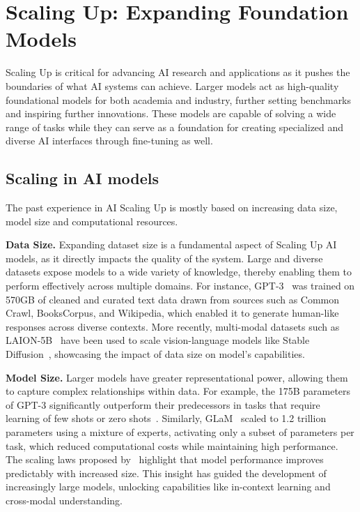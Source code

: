 \section{Scaling Up: Expanding Foundation Models}
    Scaling Up is critical for advancing AI research and applications as it pushes the boundaries of what AI systems can achieve. Larger models act as high-quality foundational models for both academia and industry, further setting benchmarks and inspiring further innovations. These models are capable of solving a wide range of tasks while they can serve as a foundation for creating specialized and diverse AI interfaces through fine-tuning as well. 
    
\subsection{Scaling in AI models}
The past experience in AI Scaling Up is mostly based on increasing data size, model size and computational resources.

\textbf{Data Size.}
Expanding dataset size is a fundamental aspect of Scaling Up AI models, as it directly impacts the quality of the system. Large and diverse datasets expose models to a wide variety of knowledge, thereby enabling them to perform effectively across multiple domains. For instance, GPT-3~\cite{brown2020language} was trained on 570GB of cleaned and curated text data drawn from sources such as Common Crawl, BooksCorpus, and Wikipedia, which enabled it to generate human-like responses across diverse contexts. 
More recently, multi-modal datasets such as LAION-5B~\cite{schuhmann2022laion} have been used to scale vision-language models like Stable Diffusion~\cite{rombach2022high}, showcasing the impact of data size on model's capabilities. 
    
\textbf{Model Size.}
Larger models have greater representational power, allowing them to capture complex relationships within data. For example, the 175B parameters of GPT-3 significantly outperform their predecessors in tasks that require learning of few shots or zero shots~\cite{brown2020language}. Similarly, GLaM~\cite{du2022glam} scaled to 1.2 trillion parameters using a mixture of experts, activating only a subset of parameters per task, which reduced computational costs while maintaining high performance. The scaling laws proposed by~\cite{kaplan2020scaling} highlight that model performance improves predictably with increased size. This insight has guided the development of increasingly large models, unlocking capabilities like in-context learning and cross-modal understanding.


